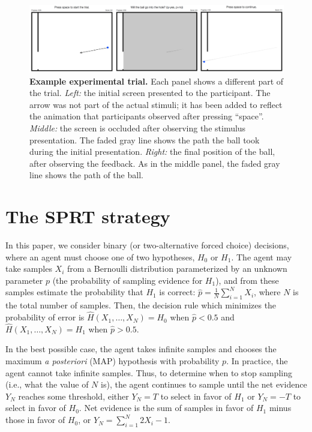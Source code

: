 \documentclass[10pt,letterpaper]{article}
\begin{document}
\begin{figure}[t]
    \begin{center}
        \includegraphics[width=\textwidth]{figures/experiment.png}
        \caption{\textbf{Example experimental trial.} 
        Each panel shows a different part of the trial. 
        \emph{Left:} the initial screen presented to the participant.
        The arrow was not part of the actual stimuli; it has been added to reflect the animation that participants observed after pressing ``space''. 
        \emph{Middle:}  the screen is occluded after observing the stimulus presentation. 
        The faded gray line shows the path the ball took during the initial presentation. 
        \emph{Right:} the final position of the ball, after observing the feedback. 
        As in the middle panel, the faded gray line shows the path of the ball.}
        \label{fig:experiment}
    \end{center}
\end{figure}

\section{The SPRT strategy}

In this paper, we consider binary (or two-alternative forced choice) decisions, where an agent must choose one of two hypotheses, $H_0$ or $H_1$. 
The agent may take samples $X_i$ from a Bernoulli distribution parameterized by an unknown parameter $p$ (the probability of sampling evidence for $H_1$), and from these samples estimate the probability that $H_1$ is correct: $\hat{p}=\frac{1}{N}\sum_{i=1}^N X_i$, where $N$ is the total number of samples. 
Then, the decision rule which minimizes the probability of error is $\hat{H}(X_1,\ldots{},X_N)=H_0$ when $\hat{p}<0.5$ and $\hat{H}(X_1,\ldots{},X_N)=H_1$ when $\hat{p}>0.5$.

In the best possible case, the agent takes infinite samples and chooses the maximum \emph{a posteriori} (MAP) hypothesis with probability $p$. 
In practice, the agent cannot take infinite samples. 
Thus, to determine when to stop sampling (i.e., what the value of $N$ is), the agent continues to sample until the net evidence $Y_N$ reaches some threshold, either $Y_N=T$ to select in favor of $H_1$ or $Y_N=-T$ to select in favor of $H_0$. 
Net evidence is the sum of samples in favor of $H_1$ minus those in favor of $H_0$, or $Y_N=\sum_{i=1}^N 2X_i-1$.
\end{document}
